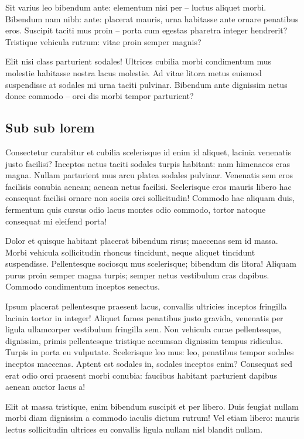\documentclass[
  brazilian,
  11pt,
  a4paper,
  open = right,
  twoside = true]{scrbook}
\begin{document}
Sit varius leo bibendum ante: elementum nisi per -- luctus aliquet
morbi. Bibendum nam nibh: ante: placerat mauris, urna habitasse ante
ornare penatibus eros. Suscipit taciti mus proin -- porta cum egestas
pharetra integer hendrerit? Tristique vehicula rutrum: vitae proin
semper magnis?

Elit nisi class parturient sodales! Ultrices cubilia morbi
condimentum mus molestie habitasse nostra lacus molestie. Ad vitae
litora metus euismod suspendisse at sodales mi urna taciti pulvinar.
Bibendum ante dignissim netus donec commodo -- orci dis morbi tempor
parturient?

\subsection{Sub sub lorem}\label{sub-sub-lorem}

Consectetur curabitur et cubilia scelerisque id enim id aliquet, lacinia
venenatis justo facilisi? Inceptos netus taciti sodales turpis habitant:
nam himenaeos cras magna. Nullam parturient mus arcu platea sodales
pulvinar. Venenatis sem eros facilisis conubia aenean; aenean netus
facilisi. Scelerisque eros mauris libero hac consequat facilisi ornare
non sociis orci sollicitudin! Commodo hac aliquam duis, fermentum quis
cursus odio lacus montes odio commodo, tortor natoque consequat mi
eleifend porta!

Dolor et quisque habitant placerat bibendum risus; maecenas sem id
massa. Morbi vehicula sollicitudin rhoncus tincidunt, neque aliquet
tincidunt suspendisse. Pellentesque sociosqu mus scelerisque; bibendum
dis litora! Aliquam purus proin semper magna turpis; semper netus
vestibulum cras dapibus. Commodo condimentum inceptos
senectus.

Ipsum placerat pellentesque praesent lacus, convallis ultricies inceptos
fringilla lacinia tortor in integer! Aliquet fames penatibus justo
gravida, venenatis per ligula ullamcorper vestibulum fringilla sem. Non
vehicula curae pellentesque, dignissim, primis pellentesque tristique
accumsan dignissim tempus ridiculus. Turpis in porta eu vulputate.
Scelerisque leo mus: leo, penatibus tempor sodales inceptos maecenas.
Aptent est sodales in, sodales inceptos enim? Consequat sed erat odio
orci praesent morbi conubia: faucibus habitant parturient dapibus aenean
auctor lacus a!

Elit at massa tristique, enim bibendum suscipit et per libero. Duis
feugiat nullam morbi diam dignissim a commodo iaculis dictum rutrum! Vel
etiam libero: mauris lectus sollicitudin ultrices eu convallis ligula
nullam nisl blandit nullam.
\end{document}

